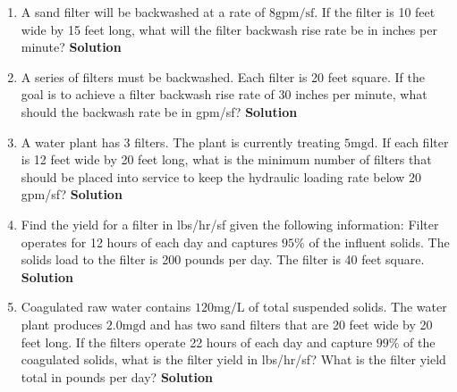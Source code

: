 \begin{enumerate}
	
	
	
	\vspace{0.2cm}
  \item A sand filter will be backwashed at a rate of $8 \mathrm{gpm} / \mathrm{sf}$. If the filter is 10 feet wide by 15 feet long, what will the filter backwash rise rate be in inches per minute?
  	\vspace{0.2cm}
	\textbf{Solution}\\
	
	
	
	
	\vspace{0.2cm}

  \item A series of filters must be backwashed. Each filter is 20 feet square. If the goal is to achieve a filter backwash rise rate of 30 inches per minute, what should the backwash rate be in gpm/sf?
  	\vspace{0.2cm}
	\textbf{Solution}\\
	
	
	
	
	\vspace{0.2cm}

  \item A water plant has 3 filters. The plant is currently treating $5 \mathrm{mgd}$. If each filter is 12 feet wide by 20 feet long, what is the minimum number of filters that should be placed into service to keep the hydraulic loading rate below 20 gpm/sf?
  	\vspace{0.2cm}
	\textbf{Solution}\\
	
	
	
	
	\vspace{0.2cm}

  \item Find the yield for a filter in lbs/hr/sf given the following information: Filter operates for 12 hours of each day and captures $95 \%$ of the influent solids. The solids load to the filter is 200 pounds per day. The filter is 40 feet square.
  	\vspace{0.2cm}
	\textbf{Solution}\\
	
	
	
	
	\vspace{0.2cm}

  \item Coagulated raw water contains $120 \mathrm{mg} / \mathrm{L}$ of total suspended solids. The water plant produces $2.0 \mathrm{mgd}$ and has two sand filters that are 20 feet wide by 20 feet long. If the filters operate 22 hours of each day and capture $99 \%$ of the coagulated solids, what is the filter yield in lbs/hr/sf? What is the filter yield total in pounds per day?
  	\vspace{0.2cm}
	\textbf{Solution}\\
	

\end{enumerate}
